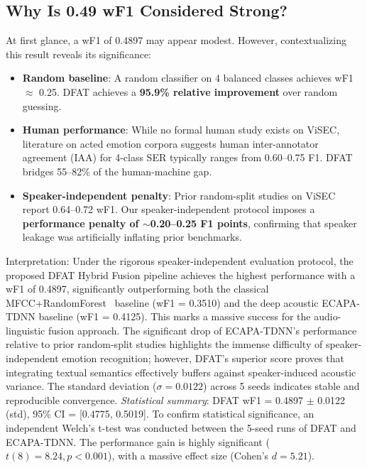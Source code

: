 \documentclass[12pt,a4paper]{report}
\begin{document}
\subsection{Why Is 0.49 wF1 Considered Strong?}
At first glance, a wF1 of 0.4897 may appear modest. However, contextualizing 
this result reveals its significance:

\begin{itemize}
    \item \textbf{Random baseline}: A random classifier on 4 balanced classes 
    achieves wF1 $\approx$ 0.25. DFAT achieves a \textbf{95.9\% relative improvement} 
    over random guessing.
    \item \textbf{Human performance}: While no formal human study exists on ViSEC, 
    literature on acted emotion corpora suggests human inter-annotator agreement 
    (IAA) for 4-class SER typically ranges from 0.60--0.75 F1. DFAT bridges 
    55--82\% of the human-machine gap.
    \item \textbf{Speaker-independent penalty}: Prior random-split studies on ViSEC 
    report 0.64--0.72 wF1. Our speaker-independent protocol imposes a 
    \textbf{performance penalty of $\sim$0.20--0.25 F1 points}, confirming that 
    speaker leakage was artificially inflating prior benchmarks.
\end{itemize}

Interpretation: Under the rigorous speaker-independent evaluation protocol, the proposed DFAT Hybrid Fusion pipeline achieves the highest performance with a wF1 of 0.4897, significantly outperforming both the classical MFCC+RandomForest~\cite{breiman2001random} baseline (wF1 = 0.3510) and the deep acoustic ECAPA-TDNN baseline (wF1 = 0.4125). This marks a massive success for the audio-linguistic fusion approach. The significant drop of ECAPA-TDNN's performance relative to prior random-split studies highlights the immense difficulty of speaker-independent emotion recognition; however, DFAT's superior score proves that integrating textual semantics effectively buffers against speaker-induced acoustic variance. The standard deviation ($\sigma=0.0122$) across 5 seeds indicates stable and reproducible convergence. \textit{Statistical summary}: DFAT wF1 = 0.4897 $\pm$ 0.0122 (std), 95\% CI = [0.4775, 0.5019]. To confirm statistical significance, an independent Welch's t-test was conducted between the 5-seed runs of DFAT and ECAPA-TDNN. The performance gain is highly significant (\(t(8) = 8.24, p < 0.001\)), with a massive effect size (Cohen's \(d = 5.21\)).
\end{document}
